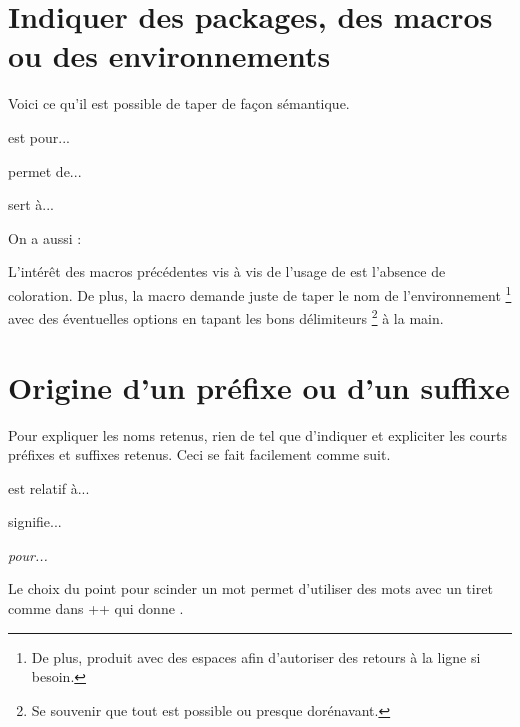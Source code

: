 \documentclass[12pt, a4paper]{article}
\begin{document}
\section{Indiquer des packages, des macros ou des environnements}

Voici ce qu'il est possible de taper de façon sémantique.

\begin{bdoclatex}[sbs]
 est pour...

 permet de...

 sert à...

On a aussi :

\end{bdoclatex}


\begin{bdocrem}
    L'intérêt des macros précédentes vis à vis de l'usage de  est l'absence de coloration.
    De plus, la macro  demande juste de taper le nom de l'environnement
    \footnote{
        De plus,  produit  avec des espaces afin d'autoriser des retours à la ligne si besoin.
    }
    avec des éventuelles options en tapant les bons délimiteurs
    \footnote{
        Se souvenir que tout est possible ou presque dorénavant.
    }
    à la main.
\end{bdocrem}




\section{Origine d'un préfixe ou d'un suffixe}

Pour expliquer les noms retenus, rien de tel que d'indiquer et expliciter les courts préfixes et suffixes retenus. Ceci se fait facilement comme suit.

\begin{bdoclatex}[sbs]
 est relatif à...

 signifie...

\emph{ pour...}
\end{bdoclatex}


\begin{bdocrem}
    Le choix du point pour scinder un mot permet d'utiliser des mots avec un tiret comme dans \bdocinlatex++ qui donne .
\end{bdocrem}
\end{document}
